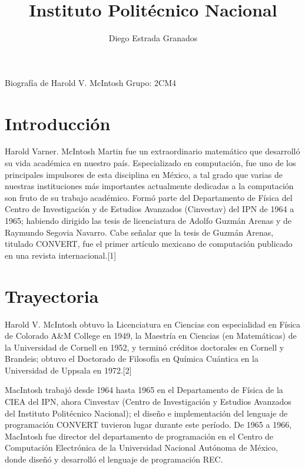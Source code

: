 \documentclass[10pt,letterpaper]{article}
\author{Diego Estrada Granados}
\title{Instituto Politécnico Nacional }
\begin{document}
\maketitle
\begin{center}
Biografía de Harold V. McIntosh 
Grupo: 2CM4\linebreak
\end{center}
\section{Introducción}
Harold Varner. McIntosh Martin fue un extraordinario matemático que
desarrolló su vida académica en nuestro país. Especializado en computación,
fue uno de los principales impulsores de esta disciplina en México, a tal grado
que varias de nuestras instituciones más importantes actualmente
dedicadas a la computación son fruto de su trabajo académico.
Formó parte del Departamento de Física del Centro de Investigación y de
Estudios Avanzados (Cinvestav) del IPN de 1964 a 1965; habiendo dirigido las
tesis de licenciatura de Adolfo Guzmán Arenas y de Raymundo Segovia
Navarro. Cabe señalar que la tesis de Guzmán Arenas, titulado CONVERT, fue
el primer artículo mexicano de computación publicado en una revista
internacional.[1]
\section{Trayectoria}
Harold V. McIntosh obtuvo la Licenciatura en Ciencias con especialidad en Física de Colorado A\&M College en 1949, la Maestría en Ciencias (en Matemáticas) de la Universidad de Cornell en 1952, y terminó créditos doctorales en Cornell y Brandeis; obtuvo el Doctorado de Filosofía en Química Cuántica en la Universidad de Uppsala en 1972.[2]

MacIntosh trabajó desde 1964 hasta 1965 en el Departamento de Física de la CIEA del IPN, ahora Cinvestav (Centro de Investigación y Estudios Avanzados del Instituto Politécnico Nacional); el diseño e implementación del lenguaje de programación CONVERT tuvieron lugar durante este período. De 1965 a 1966, MacIntosh fue director del departamento de programación en el Centro de Computación Electrónica de la Universidad Nacional Autónoma de México, donde diseñó y desarrolló el lenguaje de programación REC.
\end{document}

